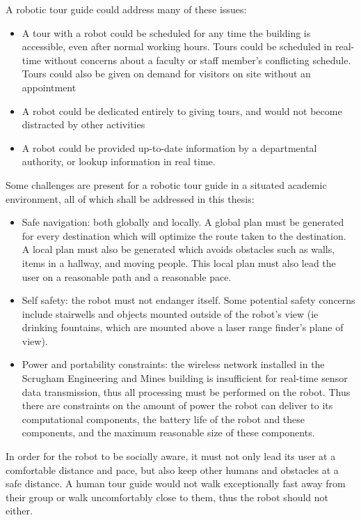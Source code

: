 \documentclass[11pt]{report}
\begin{document}
A robotic tour guide could address many of these issues:
\begin{itemize}
 \item A tour with a robot could be scheduled for any time the building is accessible, even after normal working hours. Tours could be scheduled in real-time without concerns about a faculty or staff member’s conflicting schedule. Tours could also be given on demand for visitors on site without an appointment
 \item A robot could be dedicated entirely to giving tours, and would not become distracted by other activities
 \item A robot could be provided up-to-date information by a departmental authority, or lookup information in real time.
\end{itemize}

Some challenges are present for a robotic tour guide in a situated academic environment, all of which shall be addressed in this thesis:
\begin{itemize}
 \item Safe navigation: both globally and locally. A global plan must be generated for every destination which will optimize the route taken to the destination. A local plan must also be generated which avoids obstacles such as walls, items in a hallway, and moving people. This local plan must also lead the user on a reasonable path and a reasonable pace.
 \item Self safety: the robot must not endanger itself. Some potential safety concerns include stairwells and objects mounted outside of the robot’s view (ie drinking fountains, which are mounted above a laser range finder’s plane of view).
 \item Power and portability constraints: the wireless network installed in the Scrugham Engineering and Mines building is insufficient for real-time sensor data transmission, thus all processing must be performed on the robot. Thus there are constraints on the amount of power the robot can deliver to its computational components, the battery life of the robot and these components, and the maximum reasonable size of these components.
\end{itemize}


In order for the robot to be socially aware, it must not only lead its user at a comfortable distance and pace, but also keep other humans and obstacles at a safe distance. A human tour guide would not walk exceptionally fast away from their group or walk uncomfortably close to them, thus the robot should not either.
\end{document}
